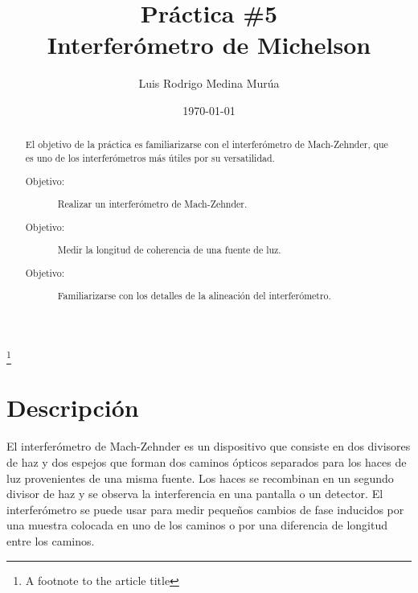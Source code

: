 



\title{Pr\'{a}ctica \#5 \\ Interferómetro de Michelson}%
\thanks{A footnote to the article title}%

\author{Luis Rodrigo Medina Murúa}

\date{\today}%

\begin{abstract}
El objetivo de la práctica es familiarizarse con el interferómetro de Mach-Zehnder, que es uno de los interferómetros más útiles por su versatilidad. 
\begin{description}
\item[Objetivo:]
Realizar un interferómetro de Mach-Zehnder.
\item[Objetivo:]
Medir la longitud de coherencia de una fuente de luz.
\item[Objetivo:]
Familiarizarse con los detalles de la alineación del interferómetro.
\end{description}
\end{abstract}

\maketitle





\section{Descripción}

El interferómetro de Mach-Zehnder es un dispositivo que consiste en dos divisores de haz y dos espejos que forman dos caminos ópticos separados para los haces de luz provenientes de una misma fuente. Los haces se recombinan en un segundo divisor de haz y se observa la interferencia en una pantalla o un detector. El interferómetro se puede usar para medir pequeños cambios de fase inducidos por una muestra colocada en uno de los caminos o por una diferencia de longitud entre los caminos.


